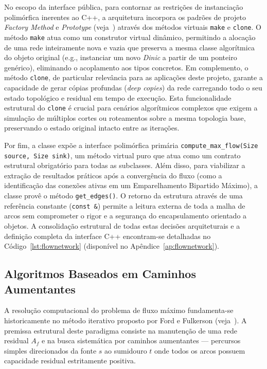 \documentclass[12pt,a4paper]{article}
\begin{document}
No escopo da interface pública, para contornar as restrições de instanciação polimórfica inerentes ao C++, a arquitetura incorpora os padrões de projeto \textit{Factory Method} e \textit{Prototype} (veja~\cite{gamma1994design}) através dos métodos virtuais \lstinline{make} e \lstinline{clone}. O método \lstinline{make} atua como um construtor virtual dinâmico, permitindo a alocação de uma rede inteiramente nova e vazia que preserva a mesma classe algorítmica do objeto original (e.g., instanciar um novo \textit{Dinic} a partir de um ponteiro genérico), eliminando o acoplamento aos tipos concretos. Em complemento, o método \lstinline{clone}, de particular relevância para as aplicações deste projeto, garante a capacidade de gerar cópias profundas (\textit{deep copies}) da rede carregando todo o seu estado topológico e residual em tempo de execução. Esta funcionalidade estrutural do \lstinline{clone} é crucial para cenários algorítmicos complexos que exigem a simulação de múltiplos cortes ou roteamentos sobre a mesma topologia base, preservando o estado original intacto entre as iterações.

Por fim, a classe expõe a interface polimórfica primária \lstinline{compute_max_flow(Size source, Size sink)}, um método virtual puro que atua como um contrato estrutural obrigatório para todas as subclasses. Além disso, para viabilizar a extração de resultados práticos após a convergência do fluxo (como a identificação das conexões ativas em um Emparelhamento Bipartido Máximo), a classe provê o método \lstinline{get_edges()}. O retorno da estrutura através de uma referência constante (\lstinline{const &}) permite a leitura externa de toda a malha de arcos sem comprometer o rigor e a segurança do encapsulamento orientado a objetos. A consolidação estrutural de todas estas decisões arquiteturais e a definição completa da interface C++ encontram-se detalhadas no Código~\ref{lst:flownetwork} (disponível no Apêndice~\ref{ap:flownetwork}).

\subsection{Algoritmos Baseados em Caminhos Aumentantes}

A resolução computacional do problema de fluxo máximo fundamenta-se historicamente no método iterativo proposto por Ford e Fulkerson (veja~\cite{ford1956maximal}). A premissa estrutural deste paradigma consiste na manutenção de uma rede residual $A_f$ e na busca sistemática por caminhos aumentantes — percursos simples direcionados da fonte $s$ ao sumidouro $t$ onde todos os arcos possuem capacidade residual estritamente positiva.
\end{document}
